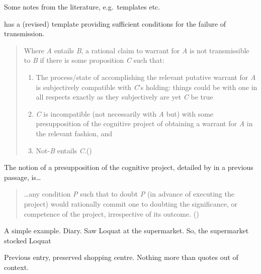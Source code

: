 \documentclass[10pt]{article}
\begin{document}
\begin{note}
  Some notes from the literature, e.g.\ templates etc.\

  \textcite{Wright:2011wn} has a (revised) template providing sufficient conditions for the failure of transmission.

  \begin{quote}
    Where \emph{A} entails \emph{B}, a rational claim to warrant for \emph{A} is not transmissible to \emph{B} if there is some proposition \emph{C} such that:

    \begin{enumerate}[label=(\roman*), ref=(\roman*)]
    \item\label{Wright:revised-template:1} The process/state of accomplishing the relevant putative warrant for \emph{A} is subjectively compatible with \emph{C}'s holding: things could be with one in all respects exactly as they subjectively are yet \emph{C} be true
    \item\label{Wright:revised-template:2} \emph{C} is incompatible (not necessarily with \emph{A} but) with some presupposition of the cognitive project of obtaining a warrant for \emph{A} in the relevant fashion, and
    \item\label{Wright:revised-template:3} Not-\emph{B} entails \emph{C}.\hfill\mbox{(\citeyear[93--94]{Wright:2011wn})}
    \end{enumerate}
  \end{quote}

  The notion of a presupposition of the cognitive project, detailed by \citeauthor{Wright:2011wn} in a previous passage, is\dots
  \begin{quote}
    \dots any condition \emph{P} such that to doubt \emph{P} (in advance of executing the project) would rationally commit one to doubting the significance, or competence of the project, irrespective of its outcome.\newline
    \mbox{}\hfill\mbox{(\citeyear[92]{Wright:2011wn})}
  \end{quote}

  A simple example.
  Diary.
  Saw Loquat at the supermarket.
  So, the supermarket stocked Loquat

  Previous entry, preserved shopping centre.
  Nothing more than quotes out of context.
\end{note}
\end{document}
